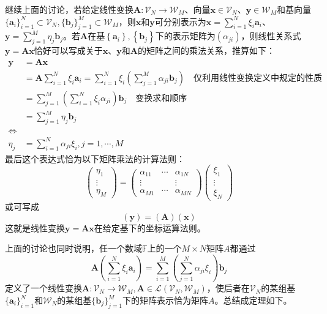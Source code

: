 \documentclass[main.tex]{subfiles}
\begin{document}
继续上面的讨论，若给定线性变换$\mathbf{A}:\mathcal{V}_N\rightarrow\mathcal{W}_M$、向量$\mathbf{x}\in\mathcal{V}_N$、$\mathbf{y}\in\mathcal{W}_M$和基向量$\{\mathbf{a}_i\}_{i=1}^N\subset\mathcal{V}_N,\{\mathbf{b}_j\}_{j=1}^M\subset\mathcal{W}_M$，则$\mathbf{x}$和$\mathbf{y}$可分别表示为$\mathbf{x}=\sum_{i=1}^N\xi_i\mathbf{a}_i$、$\mathbf{y}=\sum_{j=1}^M\eta_j\mathbf{b}_j$。若$\mathbf{A}$在基$\left\{\mathbf{a}_i\right\},\left\{\mathbf{b}_j\right\}$下的表示矩阵为$\left(\alpha_{ji}\right)$，则线性关系式$\mathbf{y}=\mathbf{Ax}$恰好可以写成关于$\mathbf{x}$、$\mathbf{y}$和$\mathbf{A}$的矩阵之间的乘法关系，推算如下：
\begin{equation*}
\begin{split}
    \mathbf{y}&=\mathbf{Ax}\\
    &=\mathbf{A}\sum_{i=1}^N\xi_i\mathbf{a}_i=\sum_{i=1}^N\xi_i\left(\sum_{j=1}^M\alpha_{ji}\mathbf{b}_j\right)\quad\text{仅利用线性变换定义中规定的性质}\\
    &=\sum_{j=1}^M\left(\sum_{i=1}^N\xi_i\alpha_{ji}\right)\mathbf{b}_j\quad\text{变换求和顺序}\\
    &=\sum_{j=1}^M\eta_j\mathbf{b}_j\\
    \Leftrightarrow\\
    \eta_j&=\sum_{i=1}^N\alpha_{ji}\xi_i,j=1,\cdots,M
\end{split}
\end{equation*}
最后这个表达式恰为以下矩阵乘法的计算法则：
\[\left(\begin{array}{ccc}\eta_1\\\vdots\\\eta_M\end{array}\right)=\left(\begin{array}{ccc}\alpha_{11}&\cdots&\alpha_{1N}\\\vdots&&\vdots\\\alpha_{M1}&\cdots&\alpha_{MN}\end{array}\right)\left(\begin{array}{ccc}\xi_1\\\vdots\\\xi_N\end{array}\right)\]
或可写成
\[\left(\mathbf{y}\right)=\left(\mathbf{A}\right)\left(\mathbf{x}\right)\]
这就是线性变换$\mathbf{y}=\mathbf{Ax}$在给定基下的坐标运算法则。

上面的讨论也同时说明，任一个数域$\mathbb{F}$上的一个$M\times N$矩阵$A$都通过
\[
\mathbf{A}\left(\sum_{i=1}^N\xi_i\mathbf{a}_i\right)=\sum_{i=1}^M\left(\sum_{j=1}^N\alpha_{ji}\xi_i\right)\mathbf{b}_j
\]
定义了一个线性变换$\mathbf{A}:\mathcal{V}_N\rightarrow\mathcal{W}_M,\mathbf{A}\in\mathcal{L}\left(\mathcal{V}_N,\mathcal{W}_M\right)$，使后者在$\mathcal{V}_N$的某组基$\{\mathbf{a}_i\}_{i=1}^N$和$\mathcal{W}_N$的某组基$\{\mathbf{b}_j\}_{j=1}^M$下的矩阵表示恰为矩阵$A$。总结成定理如下。
\end{document}
